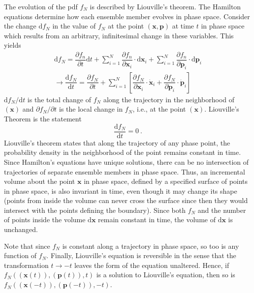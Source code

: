 \documentclass[12pt,a4paper]{article}
\renewcommand{\vec}[1]{\boldsymbol{#1}}
\newcommand{\dif}{\mathrm{d}}
\begin{document}
The evolution of the pdf $f_N$ is described by Liouville's theorem. The Hamilton equations determine how each ensemble member evolves in phase space. Consider the change $\dif f_N$ in the value of $f_N$ at the point $(\vec{x}, \vec{p})$ at time $t$ in phase space which results from an arbitrary, infinitesimal change in these variables. This yields
\begin{align}
\dif f_N = \dfrac{\partial f_n}{\partial t} \dif t + \sum_{i=1}^N \dfrac{\partial f_n}{\partial \vec{x}_i} \cdot \dif \vec{x}_i + \sum_{i=1}^N \dfrac{\partial f_n}{\partial \vec{p}_i} \cdot \dif \vec{p}_i \\
\rightarrow \dfrac{\dif f_N}{\dif t} = \dfrac{\partial f_N}{\partial t} + \sum_{i=1}^N \left[ \dfrac{\partial f_N}{\partial \vec{x}_i} \cdot \dot{\vec{x}}_i + \dfrac{\partial f_N}{\partial \vec{p}_i} \cdot \dot{\vec{p}}_i \right]
\end{align}
$\dif f_N/\dif t$ is the total change of $f_N$ along the trajectory in the neighborhood of $(\vec{x})$ and $\partial f_N /\partial t$ is the local change in $f_N$, i.e., at the point $(\vec{x})$. Liouville's Theorem is the statement
\begin{equation}
\dfrac{\dif f_N}{\dif t} = 0 ~.
\end{equation}
Liouville's theorem states that along the trajectory of any phase point, the probability density in the neighborhood of the point remains constant in time. Since Hamilton's equations have unique solutions, there can be no intersection of trajectories of separate ensemble members in phase space. Thus, an incremental volume about the point $\vec{x}$ in phase space, defined by a specified surface of points in phase space, is also invariant in time, even though it may change its shape (points from inside the volume can never cross the surface since then they would intersect with the points defining the boundary). Since both $f_N$ and the number of points inside the volume $\dif \vec{x}$ remain constant in time, the volume of $\dif \vec{x}$ is unchanged.

Note that since $f_N$ is constant along a trajectory in phase space, so too is any function of $f_N$. Finally, Liouville's equation is reversible in the sense that the transformation $t \rightarrow -t$ leaves the form of the equation unaltered. Hence, if $f_N((\vec{x}(t)), (\vec{p}(t)), t)$ is a solution to Liouville's equation, then so is $f_N((\vec{x}(-t)), (\vec{p}(-t)), -t)$.
\end{document}
